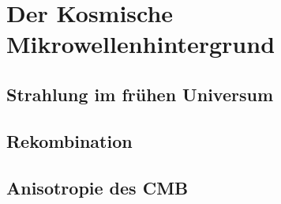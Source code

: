 %
%
%
\chapter{Der Kosmische Mikrowellenhintergrund%
\label{chapter:cmb}}
\rhead{}


\section{Strahlung im frühen Universum}

\section{Rekombination}

\section{Anisotropie des CMB}


